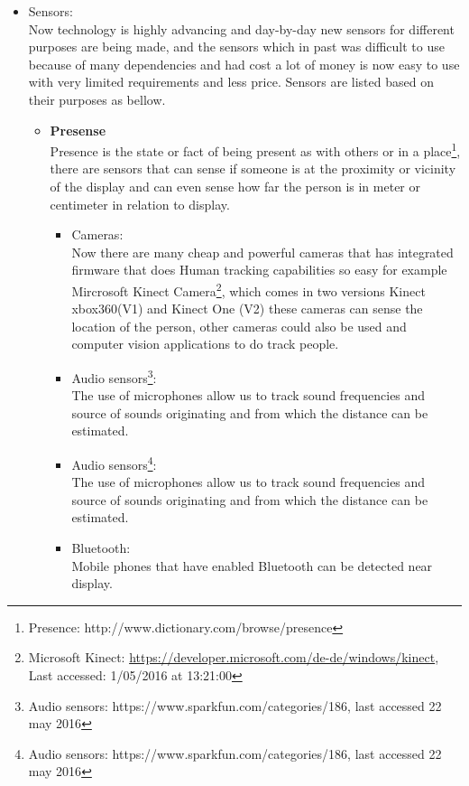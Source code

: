 \begin{itemize}
\begin{itemize}
\end{itemize}

\item Sensors: \\
Now technology is highly advancing and day-by-day new sensors for different purposes are being made, and the sensors which in past was difficult to use because of many dependencies and had cost a lot of money is now easy to use with very limited requirements and less price. Sensors are listed based on their purposes as bellow.


\begin{itemize}

\item \textbf{Presense} \\
Presence is the state or fact of being present as with others or in a place\footnote{Presence: http://www.dictionary.com/browse/presence}, there are sensors that can sense if someone is at the proximity or vicinity of the display and can even sense how far the person is in meter or centimeter in relation to display. 


\begin{itemize}
\item Cameras: \\
Now there are many cheap and powerful cameras that has integrated firmware that does Human tracking capabilities so easy for example Mircrosoft Kinect Camera\footnote{Microsoft Kinect: \url{https://developer.microsoft.com/de-de/windows/kinect}, Last accessed: 1/05/2016 at 13:21:00}, which comes in two versions Kinect xbox360(V1) and Kinect One (V2) these cameras can sense the location of the person, other cameras could also be used and computer vision applications to do track people. 

\item Audio sensors\footnote{Audio sensors: https://www.sparkfun.com/categories/186, last accessed 22 may 2016}: \\
The use of microphones allow us to track sound frequencies and source of sounds originating and from which the distance can be estimated.

\item Audio sensors\footnote{Audio sensors: https://www.sparkfun.com/categories/186, last accessed 22 may 2016}:\\
The use of microphones allow us to track sound frequencies and source of sounds originating and from which the distance can be estimated.

\item Bluetooth: \\
Mobile phones that have enabled Bluetooth can be detected near display.  


\end{itemize}
\end{itemize}
\end{itemize}
